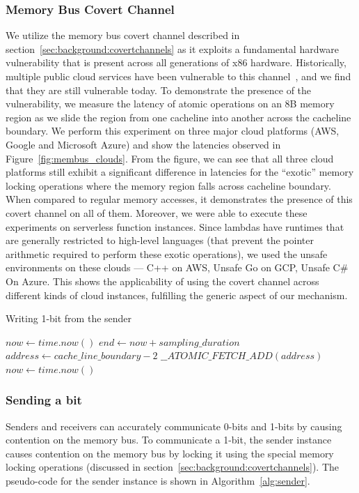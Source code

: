 \subsubsection{Memory Bus Covert Channel}
We utilize the memory bus covert channel described in
section~\ref{sec:background:covertchannels} as it exploits a fundamental
hardware vulnerability that is present across all generations of x86 hardware.
Historically, multiple public cloud services have been vulnerable to this
channel~\cite{varad191016,zhang2016}, and we find that they are still
vulnerable today. To demonstrate the presence of the vulnerability, we measure
the latency of atomic operations on an 8B memory region as we slide the region
from one cacheline into another across the cacheline boundary. We perform this
experiment on three major cloud platforms (AWS, Google and Microsoft Azure) and
show the latencies observed in Figure~\ref{fig:membus_clouds}. From the figure,
we can see that all three cloud platforms still exhibit a significant difference
in latencies for the ``exotic'' memory locking operations where the memory region
falls across cacheline boundary. When compared to regular memory accesses,
it demonstrates the presence of this covert channel on all of them. Moreover, we
were able to execute these experiments on serverless function instances. Since
lambdas have runtimes that are generally restricted to high-level languages
(that prevent the pointer arithmetic required to perform these exotic
operations), we used the unsafe environments on these clouds --- C++ on AWS,
Unsafe Go on GCP, Unsafe C\# On Azure. This shows the applicability of using the
covert channel across different kinds of cloud instances, fulfilling the generic
aspect of our mechanism.

\begin{algorithm}[!t]
\caption{Writing 1-bit from the sender}
\label{alg:sender}
\begin{algorithmic}
\STATE $now \leftarrow  time.now()$
\STATE $end \leftarrow now + sampling\_duration$
\STATE $address \leftarrow cache\_line\_boundary-2$
    \STATE $\_\_ATOMIC\_FETCH\_ADD(address)$
    \STATE $now \leftarrow  time.now()$
\ENDWHILE
\end{algorithmic}
\end{algorithm}

\subsubsection{Sending a bit}
Senders and receivers can accurately communicate 0-bits and 1-bits
by causing contention on the memory bus. To communicate a 1-bit, the sender 
instance causes contention on the memory bus by locking it using the special memory locking operations
(discussed in section~\ref{sec:background:covertchannels}). 
The pseudo-code for the sender instance is shown in Algorithm~\ref{alg:sender}.

